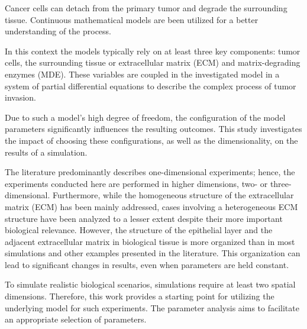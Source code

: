 Cancer cells can detach from the primary tumor and degrade the surrounding tissue. 
Continuous mathematical models are been utilized for a better understanding of the process.

In this context the models typically rely on at least three key components: tumor cells, the surrounding tissue or extracellular matrix (ECM) and matrix-degrading enzymes (MDE). These variables are coupled in the investigated model in a  system of partial differential equations to describe the complex process of tumor invasion.

Due to such a model's high degree of freedom, the configuration of the model parameters significantly influences the resulting outcomes. This study investigates the impact of choosing these configurations, as well as the dimensionality, on the results of a simulation.

The literature predominantly describes one-dimensional experiments; hence, the experiments conducted here are performed in higher dimensions, two- or three-dimensional. Furthermore, while the homogeneous structure of the extracellular matrix (ECM) has been mainly addressed, cases involving a heterogeneous ECM structure have been analyzed to a lesser extent despite their more important biological relevance. However, the structure of the epithelial layer and the adjacent extracellular matrix in biological tissue is more organized than in most simulations and other examples presented in the literature. This organization can lead to significant changes in results, even when parameters are held constant.

To simulate realistic biological scenarios, simulations require at least two spatial dimensions. Therefore, this work provides a starting point for utilizing the underlying model for such experiments. The parameter analysis aims to facilitate an appropriate selection of parameters.

